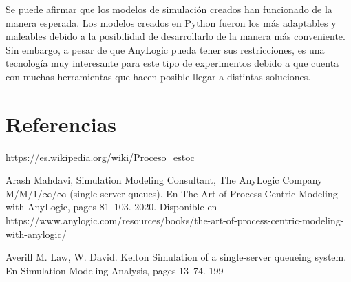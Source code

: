 Se puede afirmar que los modelos de simulación creados han funcionado de la manera esperada.
Los modelos creados en Python fueron los más adaptables y maleables debido a la posibilidad de desarrollarlo de la manera más conveniente.
Sin embargo, a pesar de que AnyLogic pueda tener sus restricciones, es una tecnología muy interesante para este tipo de experimentos debido a que cuenta con muchas herramientas que hacen posible llegar a distintas soluciones.

\section{Referencias}
  \label{sec:references}
    https://es.wikipedia.org/wiki/Proceso\_estoc%

    Arash Mahdavi, Simulation Modeling Consultant, The AnyLogic Company M/M/1/$\infty$/$\infty$ (single-server
    queues). En The Art of Process-Centric Modeling with AnyLogic, pages 81–103. 2020. Disponible en https://www.anylogic.com/resources/books/the-art-of-process-centric-modeling-with-anylogic/

    Averill M. Law, W. David. Kelton Simulation of a single-server queueing system. En Simulation Modeling Analysis,
    pages 13–74. 199
